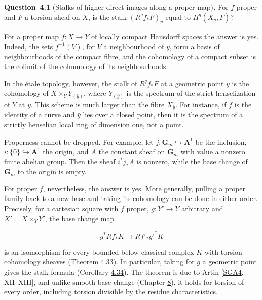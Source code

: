 \documentclass[11pt]{article}
\newenvironment{bpstatement}[2]{\par\addvspace{0.6\baselineskip}\noindent\textbf{#1}#2\textbf{.}\enspace\ignorespaces}
  {\par\addvspace{0.4\baselineskip}}
\begin{document}
\label{bp287}%
\begin{bpstatement}{Question~4.1}{ (Stalks of higher direct images along a proper map)}
For \(f\) proper and \(F\) a torsion sheaf on \(X\), is the stalk \((R^qf_*F)_{\bar y}\) equal to \(H^q(X_{\bar y},F)\)?
\end{bpstatement}

\label{bp288}%
For a proper map \(f:X\to Y\) of locally compact Hausdorff spaces the answer is yes. Indeed, the sets \(f^{-1}(V)\), for \(V\) a neighbourhood of \(y\), form a basis of neighbourhoods of the compact fibre, and the cohomology of a compact subset is the colimit of the cohomology of its neighbourhoods.

In the étale topology, however, the stalk of \(R^qf_*F\) at a geometric point \(\bar y\) is the cohomology of \(X\times_YY_{(\bar y)}\), where \(Y_{(\bar y)}\) is the spectrum of the strict henselization of \(Y\) at \(\bar y\). This scheme is much larger than the fibre \(X_{\bar y}\). For instance, if \(f\) is the identity of a curve and \(\bar y\) lies over a closed point, then it is the spectrum of a strictly henselian local ring of dimension one, not a point.

Properness cannot be dropped. For example, let \(j:\mathbf G_m\hookrightarrow\mathbf A^1\) be the inclusion, \(i:\{0\}\hookrightarrow\mathbf A^1\) the origin, and \(A\) the constant sheaf on \(\mathbf G_m\) with value a nonzero finite abelian group. Then the sheaf \(i^*j_*A\) is nonzero, while the base change of \(\mathbf G_m\) to the origin is empty.

For proper \(f\), nevertheless, the answer is yes. More generally, pulling a proper family back to a new base and taking its cohomology can be done in either order. Precisely, for a cartesian square with \(f\) proper, \(g:Y'\to Y\) arbitrary and \(X'=X\times_YY'\), the base change map

\[
g^*Rf_*K\longrightarrow Rf'_*g'^*K
\]

is an isomorphism for every bounded below classical complex \(K\) with torsion cohomology sheaves (Theorem \hyperref[bp382]{4.33}). In particular, taking for \(g\) a geometric point gives the stalk formula (Corollary \hyperref[bp386]{4.34}). The theorem is due to Artin [\hyperref[bp702]{SGA4}, XII–XIII], and unlike smooth base change (Chapter \hyperref[bp637]{8}), it holds for torsion of every order, including torsion divisible by the residue characteristics.
\end{document}

